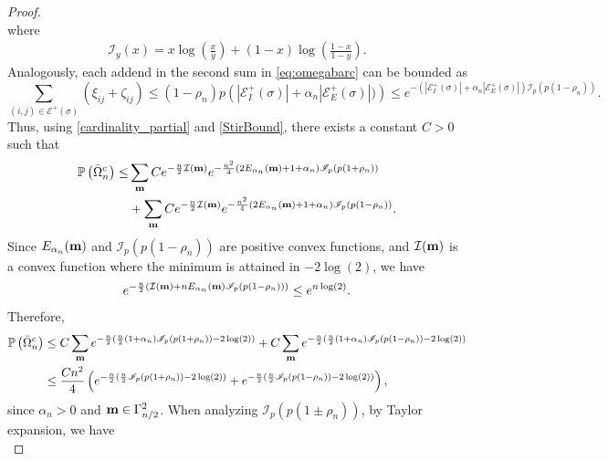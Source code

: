 \documentclass[11pt,oneside]{amsart}
\numberwithin{equation}{section}  %
\theoremstyle{plain}
\theoremstyle{remark}
\def \cE {\mathcal{E}}
\def \s {{\sigma}}
\def \bm {{\bf m}}
\begin{document}
\begin{proof}
\begin{equation*}
\end{equation*}
where
\begin{align*}
    \mathscr{I}_y(x)=x \log \left ( \frac{x}{y} \right ) + (1-x) \log \left (\frac{1-x}{1-y} \right ).
\end{align*}
Analogously, each addend in the second sum in \eqref{eq:omegabarc} can be bounded as
\begin{equation*}
\sum_{(i, j)\in \cE^{+}(\sigma) }(\xi_{i j}+\zeta_{i j}) \leq (1-\rho_n)p \left(|\cE_{I}^{+} (\s)|+ \alpha_n | \cE_{E}^{+} (\s)|) \right ) \leq e^{ - (\left|\cE_{I}^{+} (\s)\right|+ \alpha_n \left|\cE_{E}^{+} (\s)\right|) \mathscr{I}_p (p(1-\rho_n))}.
\end{equation*}
Thus, using \eqref{cardinality_partial} and \eqref{StirBound}, there exists a constant $C>0$ such that
\begin{equation*}
\begin{split}
    \mathbb{P}\left(\bar{\Omega}^{c}_n\right) 
     \leq & \sum_{\bm} Ce^{-\frac{n}{2}\mathcal{I}(\bm)} e^{ -\frac{n^2}{4} \left ( 2E_{\alpha_n}(\bm)+1+\alpha_n\right ) \mathscr{I}_p (p(1+\rho_n))} \\
     & + \sum_{\bm} Ce^{-\frac{n}{2}\mathcal{I}(\bm)} e^{ -\frac{n^2}{4} \left ( 2E_{\alpha_n}(\bm)+1+\alpha_n\right ) \mathscr{I}_p (p(1-\rho_n))}.
\end{split}
\end{equation*}
Since $E_{\alpha_n}(\bm)$ and $\mathscr{I}_p (p(1-\rho_n))$ are positive convex functions, and $\mathcal{I}(\bm)$ is a convex function where the minimum is attained in $-2\log(2)$, we have
\begin{align*}
  e^{-\frac{n}{2} (\mathcal{I}(\bm)+ nE_{\alpha_n}(\bm) \mathscr{I}_p (p(1-\rho_n)))}   \leq 
  e^{n\log(2)}.
\end{align*}
Therefore, 
\begin{align*}
    \mathbb{P}\left(\bar{\Omega}^{c}_n\right)
    & \leq C\sum_{\bm} e^{-\frac{n}{2}(\frac{n}{2} (1+\alpha_n) \mathscr{I}_p (p(1+\rho_n))-2\log(2))} +
    C\sum_{\bm} e^{-\frac{n}{2}(\frac{n}{2} (1+\alpha_n) \mathscr{I}_p (p(1-\rho_n))-2\log(2))} \\
    & \leq \frac{Cn^2}{4} \left (e^{-\frac{n}{2}(\frac{n}{2} \mathscr{I}_p (p(1+\rho_n))-2\log(2))} +
    e^{-\frac{n}{2}(\frac{n}{2} \mathscr{I}_p (p(1-\rho_n))-2\log(2))} \right ),
\end{align*}
since $\alpha_n>0$ and $\bm \in \Gamma_{n/2}^2$.
When analyzing $\mathscr{I}_{p}(p(1 \pm \rho_n))$, by Taylor expansion, we have
\begin{equation*}

\end{equation*}
\end{proof}
\end{document}
